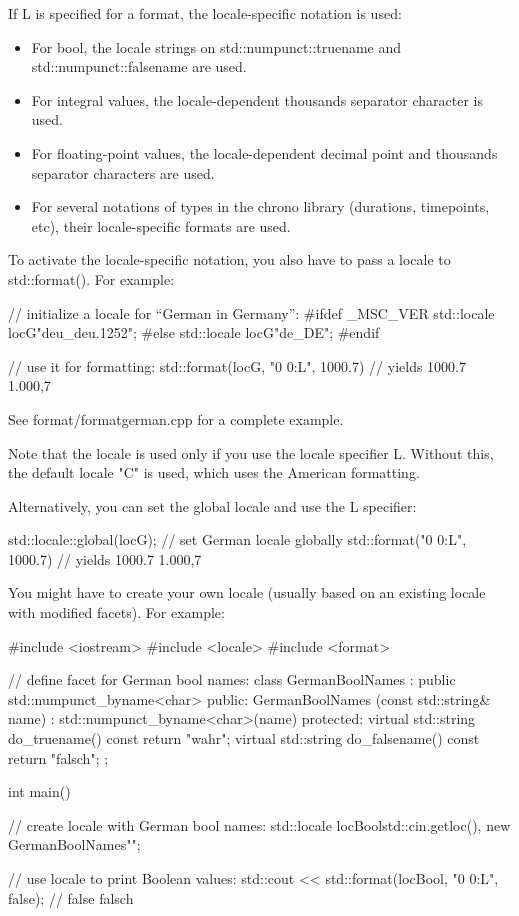 If L is specified for a format, the locale-specific notation is used:

\begin{itemize}
\item 
For bool, the locale strings on std::numpunct::truename and std::numpunct::falsename are used.

\item 
For integral values, the locale-dependent thousands separator character is used.

\item 
For floating-point values, the locale-dependent decimal point and thousands separator characters are used.

\item 
For several notations of types in the chrono library (durations, timepoints, etc), their locale-specific formats are used.
\end{itemize}

To activate the locale-specific notation, you also have to pass a locale to std::format(). For example:

\begin{cpp}
// initialize a locale for “German in Germany”:
#ifdef _MSC_VER
std::locale locG{"deu_deu.1252"};
#else
std::locale locG{"de_DE"};
#endif

// use it for formatting:
std::format(locG, "{0} {0:L}", 1000.7) // yields 1000.7 1.000,7
\end{cpp}

See format/formatgerman.cpp for a complete example.

Note that the locale is used only if you use the locale specifier L. Without this, the default locale "C" is used, which uses the American formatting.

Alternatively, you can set the global locale and use the L specifier:

\begin{cpp}
std::locale::global(locG); // set German locale globally
std::format("{0} {0:L}", 1000.7) // yields 1000.7 1.000,7
\end{cpp}

You might have to create your own locale (usually based on an existing locale with modified facets). For example:


\begin{cpp}
#include <iostream>
#include <locale>
#include <format>

// define facet for German bool names:
class GermanBoolNames : public std::numpunct_byname<char> {
	public:
	GermanBoolNames (const std::string& name)
	: std::numpunct_byname<char>(name) {
	}
	protected:
	virtual std::string do_truename() const {
		return "wahr";
	}
	virtual std::string do_falsename() const {
		return "falsch";
	}
};

int main()
{
	// create locale with German bool names:
	std::locale locBool{std::cin.getloc(),
						new GermanBoolNames{""}};
						
	// use locale to print Boolean values:
	std::cout << std::format(locBool, "{0} {0:L}\n", false); // false falsch
}
\end{cpp}

